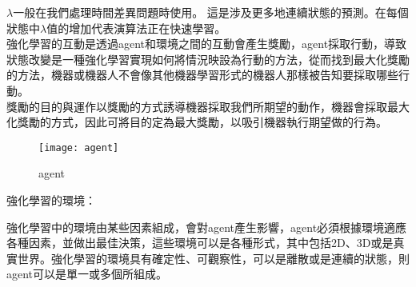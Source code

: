 $\lambda$一般在我們處理時間差異問題時使用。 這是涉及更多地連續狀態的預測。在每個狀態中$\lambda$值的增加代表演算法正在快速學習。\\
\iffalse
\begin{figure}[hbt!]
\begin{center}
\texttt{[image:  Reinforcement\_Learning\_interactions]}
\caption{\Large Reinforcement Learning interactions}
\end{center}
\end{figure}
\fi

強化學習的互動是透過agent和環境之間的互動會產生獎勵，agent採取行動，導致狀態改變是一種強化學習實現如何將情況映設為行動的方法，從而找到最大化獎勵的方法，機器或機器人不會像其他機器學習形式的機器人那樣被告知要採取哪些行動。\\

獎勵的目的與運作以獎勵的方式誘導機器採取我們所期望的動作，機器會採取最大化獎勵的方式，因此可將目的定為最大獎勵，以吸引機器執行期望做的行為。\\

\begin{figure}[hbt!]
\begin{center}
\texttt{[image: agent]}
\caption{\Large agent}
\label{agent}
\end{center}
\end{figure}
\begin{flushleft}
強化學習的環境：\\
\end{flushleft}
強化學習中的環境由某些因素組成，會對agent產生影響，agent必須根據環境適應各種因素，並做出最佳決策，這些環境可以是各種形式，其中包括2D、3D或是真實世界。強化學習的環境具有確定性、可觀察性，可以是離散或是連續的狀態，則agent可以是單一或多個所組成。\\
